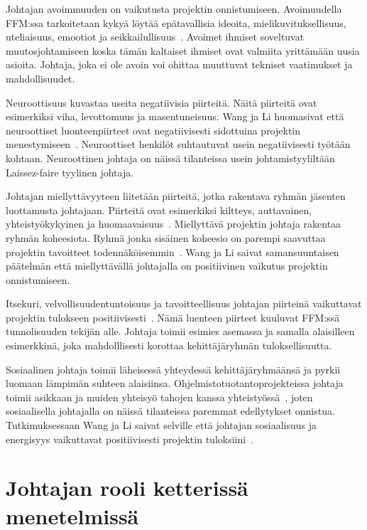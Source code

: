 \documentclass[finnish]{tktltiki2}
\theoremstyle{definition}
\theoremstyle{remark}
\begin{document}
Johtajan avoimmuuden on vaikutusta projektin onnistumiseen. Avoimuudella FFM:ssa tarkoitetaan kykyä löytää epätavallisia ideoita, mielikuvituksellisuus, uteliaisuus, emootiot ja seikkailullisuus~\cite{Wang:2009:PMP:1639950.1640049}. Avoimet ihmiset soveltuvat muutosjohtamiseen koska tämän kaltaiset ihmiset ovat valmiita yrittämään uusia asioita. Johtaja, joka ei ole avoin voi ohittaa muuttuvat tekniset vaatimukset ja mahdollisuudet. 

Neuroottisuus kuvastaa useita negatiivisia piirteitä. Näitä piirteitä ovat esimerkiksi viha, levottomuus ja masentuneisuus. Wang ja Li huomasivat että neuroottiset luonteenpiirteet ovat negatiivisesti sidottuina projektin menestymiseen~\cite{Wang:2009:PMP:1639950.1640049}. Neuroottiset henkilöt suhtautuvat usein negatiivisesti työtään kohtaan. Neuroottinen johtaja on näissä tilanteissa usein johtamistyyliltään Laissez-faire tyylinen johtaja.

Johtajan miellyttävyyteen liitetään piirteitä, jotka rakentava ryhmän jäsenten luottamusta johtajaan. Piirteitä ovat esimerkiksi kiltteys, auttavainen, yhteistyökykyinen ja huomaavaisuus~\cite{Wang:2009:PMP:1639950.1640049}. Miellyttävä projektin johtaja rakentaa ryhmän koheesiota. Ryhmä jonka sisäinen koheesio on parempi saavuttaa projektin tavoitteet todennäköisemmin~\cite{bahli2005group}. Wang ja Li saivat samansuuntaisen päätelmän että miellyttävällä johtajalla on positiivinen vaikutus projektin onnistumiseen.

Itsekuri, velvollisuudentuntoisuus ja tavoitteellisuus johtajan piirteinä vaikuttavat projektin tulokseen positiivisesti~\cite{Wang:2009:PMP:1639950.1640049}. Nämä luenteen piirteet kuuluvat FFM:ssä tunnolisuuden tekijän alle. Johtaja toimii esimies asemassa ja samalla alaisilleen esimerkkinä, joka mahdolllisesti korottaa kehittäjäryhmän tuloksellisuutta. 

Sosiaalinen johtaja toimii läheisessä yhteydessä kehittäjäryhmäänsä ja pyrkii luomaan lämpimän suhteen alaisiinsa. Ohjelmistotuotantoprojekteissa johtaja toimii asikkaan ja muiden yhteisyö tahojen kanssa yhteistyössä~\cite{McLeod:2011:FAS:1978802.1978803}, joten sosiaalisella johtajalla on näissä tilanteissa paremmat edellytykset onnistua. Tutkimuksessaan Wang ja Li saivat selville että johtajan sosiaalisuus ja energisyys vaikuttavat positiivisesti  projektin tuloksiini~\cite{Wang:2009:PMP:1639950.1640049}. 



\section{Johtajan rooli ketterissä menetelmissä}
\end{document}
